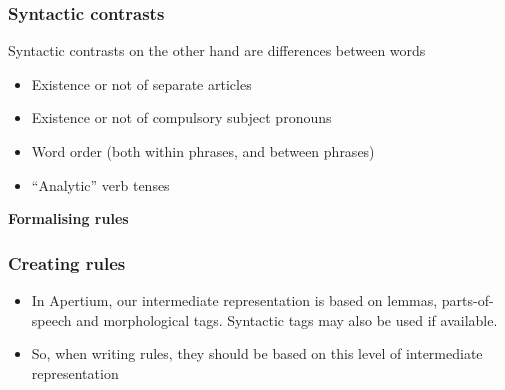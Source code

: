 \documentclass[10pt,xetex]{beamer} %
\begin{document}
\begin{frame}
  \frametitle{Syntactic contrasts}

Syntactic contrasts on the other hand are differences between words

\begin{itemize}
  \item Existence or not of separate articles
  \item Existence or not of compulsory subject pronouns
  \item Word order (both within phrases, and between phrases)
  \item ``Analytic'' verb tenses
\end{itemize}

\end{frame}




\begin{frame} %
 \begin{center}
 {\Large {\bf Formalising rules}} %
 \end{center}
\end{frame}


\begin{frame}
  \frametitle{Creating rules}

\begin{itemize}
\item In Apertium, our intermediate representation is based on lemmas, parts-of-speech and morphological tags. Syntactic tags may also be used if available.
\item So, when writing rules, they should be based on this level of intermediate representation
\end{itemize}

\end{frame}
\end{document}
